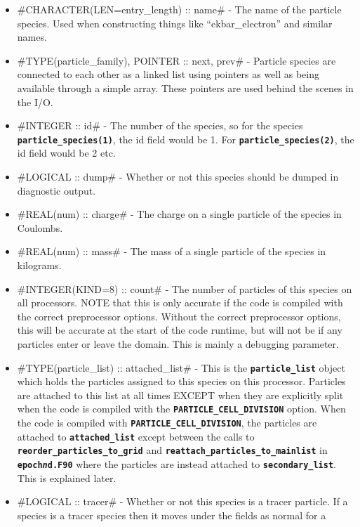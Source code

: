 \documentclass[12pt,a4paper]{article}
\newcommand{\inlinecode}[1]{{\color{warwickred} \bf\texttt{#1}}}
\begin{document}
\begin{itemize}
\item #CHARACTER(LEN=entry_length) :: name# - The name of the particle
  species. Used when constructing things like ``ekbar\_electron'' and similar
  names.
\item #TYPE(particle_family), POINTER :: next, prev# - Particle species are
  connected to each other as a linked list using pointers as well as being
  available through a simple array. These pointers are used behind the scenes
  in the I/O.
\item #INTEGER :: id# - The number of the species, so for the species
  \inlinecode{particle\_species(1)}, the id field would be 1. For
  \inlinecode{particle\_species(2)}, the id field would be 2 etc.
\item #LOGICAL :: dump# - Whether or not this species should be dumped in
  diagnostic output.
\item #REAL(num) :: charge# - The charge on a single particle of the species in
  Coulombs.
\item #REAL(num) :: mass# - The mass of a single particle of the species in
  kilograms.
\item #INTEGER(KIND=8) :: count# - The number of particles of this species on
  all processors. NOTE that this is only accurate if the code is compiled with
  the correct preprocessor options. Without the correct preprocessor options,
  this will be accurate at the start of the code runtime, but will not be if
  any particles enter or leave the domain. This is mainly a debugging
  parameter.
\item #TYPE(particle_list) :: attached_list# - This is the
  \inlinecode{particle\_list} object which holds the particles assigned to this
  species on this processor. Particles are attached to this list at all
  times EXCEPT when they are explicitly split when the code is
  compiled with the
  \inlinecode{PARTICLE\_CELL\_DIVISION} option. When the code is compiled with
  \inlinecode{PARTICLE\_CELL\_DIVISION}, the particles are attached to
  \inlinecode{attached\_list} except between the calls to
  \inlinecode{reorder\_particles\_to\_grid} and\linebreak
  \inlinecode{reattach\_particles\_to\_mainlist} in
  \inlinecode{epoch{\it n}d.F90} where the particles are instead attached to
  \inlinecode{secondary\_list}. This is explained later.
\item #LOGICAL :: tracer# - Whether or not this species is a tracer particle. If
  a species is a tracer species then it moves under the fields as normal for a

\end{itemize}
\end{document}
